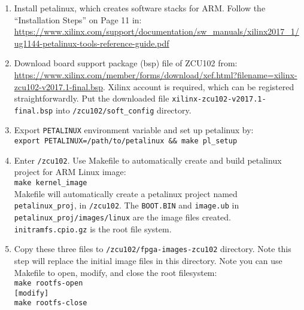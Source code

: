 \documentclass[a4paper,11pt]{article}
\begin{document}
\begin{enumerate}
\item Install petalinux, which creates software stacks for ARM. Follow the ``Installation Steps'' on Page 11 in: \url{https://www.xilinx.com/support/documentation/sw_manuals/xilinx2017_1/ug1144-petalinux-tools-reference-guide.pdf}

\item Download board support package (bsp) file of ZCU102 from: \url{https://www.xilinx.com/member/forms/download/xef.html?filename=xilinx-zcu102-v2017.1-final.bsp}. Xilinx account is required, which can be registered straightforwardly. Put the downloaded file {\tt xilinx-zcu102-v2017.1-final.bsp} into {\tt \rootdir/zcu102/soft\_config} directory.


\item Export {\tt PETALINUX} environment variable and set up petalinux by:\\
{\tt export PETALINUX=/path/to/petalinux \&\& make pl\_setup}

\item Enter {\tt \rootdir/zcu102}. Use Makefile to automatically create and build petalinux project for ARM Linux image:\\
{\tt make kernel\_image}\\
Makefile will automatically create a petalinux project named {\tt petalinux\_proj}, in {\tt \rootdir/zcu102}.
The {\tt BOOT.BIN} and {\tt image.ub} in {\tt petalinux\_proj/images/linux} are the image files created. {\tt initramfs.cpio.gz} is the root file system.

\item Copy these three files to {\tt \rootdir/zcu102/fpga-images-zcu102} directory. Note this step will replace the initial image files in this directory. Note you can use Makefile to open, modify, and close the root filesystem:\\
{\tt make rootfs-open}\\
{\tt [modify]}\\
{\tt make rootfs-close}
\end{enumerate}
\end{document}
